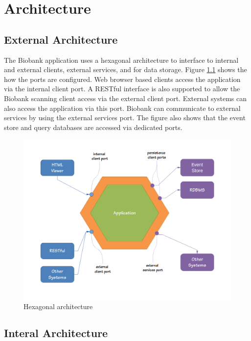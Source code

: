 \chapter{Architecture}

\section{External Architecture}

The Biobank application uses a hexagonal architecture to interface to internal
and external clients, external services, and for data storage. Figure
\ref{fig:hex-architecture} shows the how the ports are configured. Web browser
based clients access the application via the internal client port. A RESTful
interface is also supported to allow the Biobank scanning client access via the
external client port. External systems can also access the application via this
port. Biobank can communicate to external services by using the external
services port. The figure also shows that the event store and query databases
are accessed via dedicated ports.

\begin{figure}[h]
  \includegraphics[trim={15mm 18mm 15mm 12mm}, clip, width=1\textwidth]{images/hex-architecture}
  \caption{Hexagonal architecture}
  \label{fig:hex-architecture}
\end{figure}

\section{Interal Architecture}

